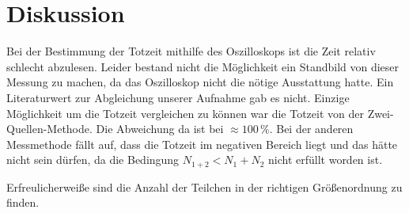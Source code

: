 \section{Diskussion}
Bei der Bestimmung der Totzeit mithilfe des Oszilloskops ist die Zeit relativ schlecht abzulesen.
Leider bestand nicht die Möglichkeit ein Standbild von dieser Messung zu machen, da das Oszilloskop nicht die nötige
Ausstattung hatte. Ein Literaturwert zur Abgleichung unserer Aufnahme gab es nicht.
Einzige Möglichkeit um die Totzeit vergleichen zu können war die Totzeit von der Zwei-Quellen-Methode.
Die Abweichung da ist bei $\approx 100 \, \%$.
Bei der anderen Messmethode fällt auf, dass die Totzeit im negativen Bereich liegt und das hätte nicht sein dürfen,
da die Bedingung $N_{1+2} < N_1 + N_2$ nicht erfüllt worden ist.

Erfreulicherweiße sind die Anzahl der Teilchen in der richtigen Größenordnung zu finden.
